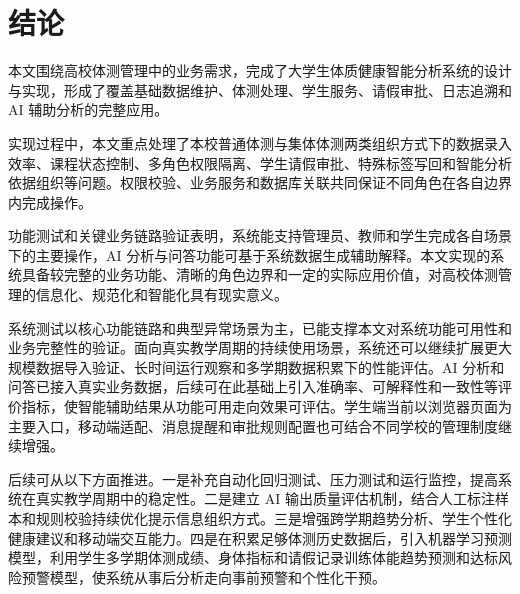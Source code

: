
\chapter{结论}\label{ch:conclusion}

本文围绕高校体测管理中的业务需求，完成了大学生体质健康智能分析系统的设计与实现，形成了覆盖基础数据维护、体测处理、学生服务、请假审批、日志追溯和 AI 辅助分析的完整应用。

实现过程中，本文重点处理了本校普通体测与集体体测两类组织方式下的数据录入效率、课程状态控制、多角色权限隔离、学生请假审批、特殊标签写回和智能分析依据组织等问题。权限校验、业务服务和数据库关联共同保证不同角色在各自边界内完成操作。

功能测试和关键业务链路验证表明，系统能支持管理员、教师和学生完成各自场景下的主要操作，AI 分析与问答功能可基于系统数据生成辅助解释。本文实现的系统具备较完整的业务功能、清晰的角色边界和一定的实际应用价值，对高校体测管理的信息化、规范化和智能化具有现实意义。

系统测试以核心功能链路和典型异常场景为主，已能支撑本文对系统功能可用性和业务完整性的验证。面向真实教学周期的持续使用场景，系统还可以继续扩展更大规模数据导入验证、长时间运行观察和多学期数据积累下的性能评估。AI 分析和问答已接入真实业务数据，后续可在此基础上引入准确率、可解释性和一致性等评价指标，使智能辅助结果从功能可用走向效果可评估。学生端当前以浏览器页面为主要入口，移动端适配、消息提醒和审批规则配置也可结合不同学校的管理制度继续增强。

后续可从以下方面推进。一是补充自动化回归测试、压力测试和运行监控，提高系统在真实教学周期中的稳定性。二是建立 AI 输出质量评估机制，结合人工标注样本和规则校验持续优化提示信息组织方式。三是增强跨学期趋势分析、学生个性化健康建议和移动端交互能力。四是在积累足够体测历史数据后，引入机器学习预测模型，利用学生多学期体测成绩、身体指标和请假记录训练体能趋势预测和达标风险预警模型，使系统从事后分析走向事前预警和个性化干预。
